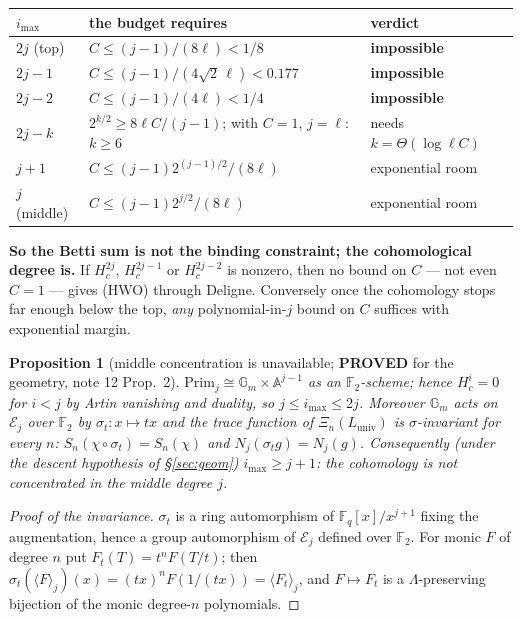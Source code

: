\documentclass[10pt]{article}
\theoremstyle{plain}
\newtheorem{proposition}[theorem]{Proposition}
\theoremstyle{definition}
\newcommand{\F}{\mathbb F}
\newcommand{\E}{\mathcal E}
\newcommand{\Lam}{\Lambda}
\newcommand{\Prim}{\mathrm{Prim}}
\newcommand{\Luniv}{L_{\mathrm{univ}}}
\newcommand{\imax}{i_{\max}}
\newcommand{\proved}{\textcolor{proved}{\textsf{\textbf{\footnotesize PROVED}}}}
\begin{document}
\begin{center}\small
\begin{tabular}{lll}
\hline
$\imax$ & the budget requires & verdict\\
\hline
$2j$ (top) & $C\le(j-1)/(8\ell)<1/8$ & \textbf{impossible}\\
$2j-1$ & $C\le(j-1)/(4\sqrt2\,\ell)<0.177$ & \textbf{impossible}\\
$2j-2$ & $C\le(j-1)/(4\ell)<1/4$ & \textbf{impossible}\\
$2j-k$ & $2^{k/2}\ge8\ell C/(j-1)$; with $C=1$, $j=\ell$: $k\ge6$ & needs $k=\Theta(\log \ell C)$\\
$j+1$ & $C\le(j-1)2^{(j-1)/2}/(8\ell)$ & exponential room\\
$j$ (middle) & $C\le(j-1)2^{j/2}/(8\ell)$ & exponential room\\
\hline
\end{tabular}
\end{center}

\textbf{So the Betti sum is not the binding constraint; the cohomological
degree is.} If $H^{2j}_c$, $H^{2j-1}_c$ or $H^{2j-2}_c$ is nonzero, then no
bound on $C$ --- not even $C=1$ --- gives (HWO) through Deligne. Conversely once
the cohomology stops far enough below the top, \emph{any} polynomial-in-$j$
bound on $C$ suffices with exponential margin.

\begin{proposition}[middle concentration is unavailable; \proved{} for the
geometry, note 12 Prop.~2]\label{prop:gm}
$\Prim_j\cong\mathbb G_m\times\mathbb A^{j-1}$ as an $\F_2$-scheme; hence
$H^i_c=0$ for $i<j$ by Artin vanishing and duality, so $j\le\imax\le2j$.
Moreover $\mathbb G_m$ acts on $\E_j$ over $\F_2$ by $\sigma_t:x\mapsto tx$ and
the trace function of $\Xi_n(\Luniv)$ is $\sigma$-invariant for every $n$:
$S_n(\chi\circ\sigma_t)=S_n(\chi)$ and $N_j(\sigma_tg)=N_j(g)$. Consequently
(under the descent hypothesis of \S\ref{sec:geom}) $\imax\ge j+1$: the
cohomology is \emph{not} concentrated in the middle degree $j$.
\end{proposition}

\begin{proof}[Proof of the invariance]
$\sigma_t$ is a ring automorphism of $\F_q[x]/x^{j+1}$ fixing the augmentation,
hence a group automorphism of $\E_j$ defined over $\F_2$. For monic $F$ of
degree $n$ put $F_t(T)=t^nF(T/t)$; then
$\sigma_t(\langle F\rangle_j)(x)=(tx)^nF(1/(tx))=\langle F_t\rangle_j$, and
$F\mapsto F_t$ is a $\Lam$-preserving bijection of the monic degree-$n$
polynomials.
\end{proof}
\end{document}
